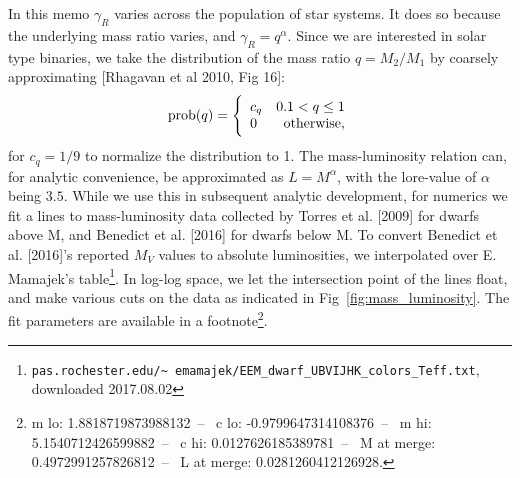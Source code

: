 \documentclass{emulateapj}
\begin{document}
In this memo $\gamma_R$ varies across the population of star systems.
It does so because the underlying mass ratio varies, and $\gamma_R = q^\alpha$. 
Since we are interested in solar type binaries, we take the distribution of the 
mass ratio $q=M_2/M_1$ by coarsely approximating [Rhagavan et al 2010, Fig 16]:
\begin{equation}
{\rm prob}(q) =
\Bigg\{\begin{array}{lr}
c_q & 0.1 < q \leq 1  \\
0 & {\rm otherwise},
\end{array}
\label{eq:mass_ratio}
\end{equation}
for $c_q = 1/9$ to normalize the distribution to 1.
The mass-luminosity relation can, for analytic convenience, be approximated as 
$L = M^\alpha$, with the lore-value of $\alpha$ being $3.5$.
While we use this in subsequent analytic development, for numerics we fit a 
lines to mass-luminosity data collected by Torres et al. [2009] for 
dwarfs above M, and Benedict et al. [2016] for dwarfs below M.
To convert Benedict et al. [2016]'s reported $M_V$ values to absolute 
luminosities, we interpolated over E. Mamajek's 
table\footnote{
\texttt{pas.rochester.edu/\textasciitilde 
emamajek/EEM\_dwarf\_UBVIJHK\_colors\_Teff.txt},
downloaded 2017.08.02}.
In log-log space, we let the intersection point of the lines float, and make 
various cuts on the data as indicated in Fig~\ref{fig:mass_luminosity}. The 
fit parameters are available in a footnote\footnote{
	m lo: 1.8818719873988132~--~
	c lo: -0.9799647314108376~--~
	m hi: 5.1540712426599882~--~
	c hi: 0.0127626185389781~--~
	M at merge: 0.4972991257826812~--~
	L at merge: 0.0281260412126928.
	}.
\end{document}
